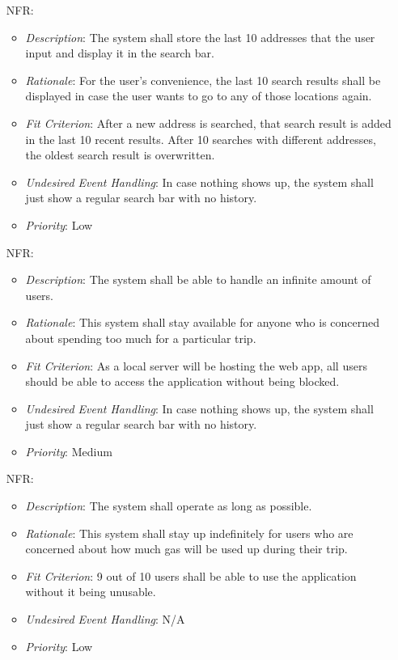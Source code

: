\documentclass[12pt]{article}
\newcounter{nfrnum} %
\begin{document}
\begin{itemize}
\item[NFR\refstepcounter{nfrnum}\thenfrnum \label{NFR_12}:] 
\begin{itemize}
  \item \textit{Description}: The system shall store the last 10 addresses that the user input and display it in the search bar.
  \item \textit{Rationale}: For the user’s convenience, the last 10 search results shall be displayed in case the user wants to go to any of those locations again.
  \item \textit{Fit Criterion}: After a new address is searched, that search result is added in the last 10 recent results. After 10 searches with different addresses, the oldest search result is overwritten.
  \item \textit{Undesired Event Handling}: In case nothing shows up, the system shall just show a regular search bar with no history.
  \item \textit{Priority}: Low
\end{itemize}

\item[NFR\refstepcounter{nfrnum}\thenfrnum \label{NFR_13}:] 
\begin{itemize}
  \item \textit{Description}: The system shall be able to handle an infinite amount of users.
  \item \textit{Rationale}: This system shall stay available for anyone who is concerned about spending too much for a particular trip.
  \item \textit{Fit Criterion}: As a local server will be hosting the web app, all users should be able to access the application without being blocked.
  \item \textit{Undesired Event Handling}: In case nothing shows up, the system shall just show a regular search bar with no history.
  \item \textit{Priority}: Medium
\end{itemize}

\item[NFR\refstepcounter{nfrnum}\thenfrnum \label{NFR_14}:] 
\begin{itemize}
  \item \textit{Description}: The system shall operate as long as possible.
  \item \textit{Rationale}: This system shall stay up indefinitely for users who are concerned about how much gas will be used up during their trip.
  \item \textit{Fit Criterion}: 9 out of 10 users shall be able to use the application without it being unusable.
  \item \textit{Undesired Event Handling}: N/A
  \item \textit{Priority}: Low
\end{itemize}


\end{itemize}
\end{document}
